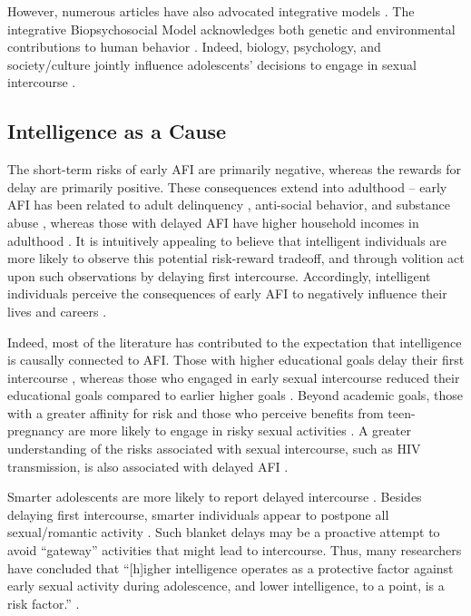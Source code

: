 However, numerous articles have also advocated integrative models \citep[See][]{harden2008rethinking,harden2014genetic,udry1995sociology}. The integrative Biopsychosocial Model acknowledges both genetic and environmental contributions to human behavior \citep{Engel1977,petersen1987nature,rodgers1999nature}. Indeed, biology, psychology, and society/culture jointly influence adolescents' decisions to engage in sexual intercourse \citep{Meschke2000,zimmer2008ten}.
%
\subsection{Intelligence as a Cause}
The short-term risks of early AFI are primarily negative, whereas the rewards for delay are primarily positive. These consequences extend into adulthood -- early AFI has been related to adult delinquency \citep{harden2008rethinking}, anti-social behavior, and substance abuse \citep{boislard2011individual}, whereas those with delayed AFI have higher household incomes in adulthood \citep{Harden2012}. It is intuitively appealing to believe that intelligent individuals are more likely to observe this potential risk-reward tradeoff, and through volition act upon such observations by delaying first intercourse. Accordingly, intelligent individuals perceive the consequences of early AFI to negatively influence their lives and careers \citep{halpern2000smart,harden2011don}.

Indeed, most of the literature has contributed to the expectation that intelligence is causally connected to AFI. Those with higher educational goals delay their first intercourse \citep{boislard2011individual,schvaneveldt2001academic}, whereas those who engaged in early sexual intercourse reduced their educational goals compared to earlier higher goals \citep{schvaneveldt2001academic}. Beyond academic goals, those with a greater affinity for risk and those who perceive benefits from teen-pregnancy are more likely to engage in risky sexual activities \citep{raffaelli2003sexual}. A greater understanding of the risks associated with sexual intercourse, such as HIV transmission, is also associated with delayed AFI \citep{mathews2009predictors}.

Smarter adolescents are more likely to report delayed intercourse \citep{halpern2000smart,mott1983early,Paul2000,Woodward2001}. Besides delaying first intercourse, smarter individuals appear to postpone all sexual/romantic activity \citep{halpern2000smart}. Such blanket delays may be a proactive attempt to avoid ``gateway'' activities that might lead to intercourse. Thus, many researchers have concluded that ``[h]igher intelligence operates as a protective factor against early sexual activity during adolescence, and lower intelligence, to a point, is a risk factor.'' \citep[][p. 213]{halpern2000smart}.

